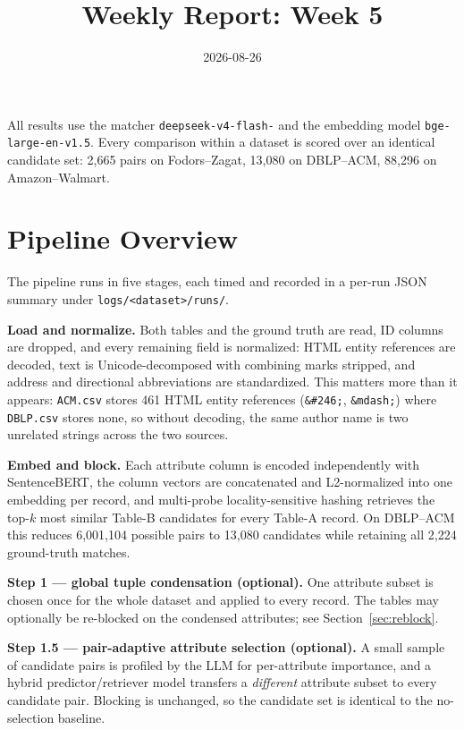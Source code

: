 \documentclass[11pt]{article}
\title{Weekly Report: Week 5}
\author{}
\date{2026-08-26}
\begin{document}
\maketitle

All results use the matcher
\texttt{deepseek-\allowbreak v4-\allowbreak flash-} and the embedding
model \texttt{bge-\allowbreak large-\allowbreak en-\allowbreak v1.5}. Every comparison within a dataset is scored over an identical
candidate set: 2{,}665 pairs on Fodors--Zagat, 13{,}080 on DBLP--ACM, 88{,}296 on
Amazon--Walmart.

\section{Pipeline Overview}

The pipeline runs in five stages, each timed and recorded in a per-run JSON summary under
\texttt{logs/<dataset>/runs/}.

\textbf{Load and normalize.} Both tables and the ground truth are read, ID columns are
dropped, and every remaining field is normalized: HTML entity references are decoded, text
is Unicode-decomposed with combining marks stripped, and address and directional
abbreviations are standardized. This matters more than it appears: \texttt{ACM.csv} stores
461 HTML entity references (\texttt{\&\#246;}, \texttt{\&mdash;}) where \texttt{DBLP.csv}
stores none, so without decoding, the same author name is two unrelated strings across the
two sources.

\textbf{Embed and block.} Each attribute column is encoded independently with SentenceBERT,
the column vectors are concatenated and L2-normalized into one embedding per record, and
multi-probe locality-sensitive hashing retrieves the top-$k$ most similar Table-B candidates
for every Table-A record. On DBLP--ACM this reduces 6{,}001{,}104 possible pairs to 13{,}080
candidates while retaining all 2{,}224 ground-truth matches.

\textbf{Step 1 --- global tuple condensation (optional).} One attribute subset is chosen
once for the whole dataset and applied to every record. The tables may optionally be
re-blocked on the condensed attributes; see Section~\ref{sec:reblock}.

\textbf{Step 1.5 --- pair-adaptive attribute selection (optional).} A small sample of
candidate pairs is profiled by the LLM for per-attribute importance, and a hybrid
predictor/retriever model transfers a \emph{different} attribute subset to every candidate
pair. Blocking is unchanged, so the candidate set is identical to the no-selection baseline.
\end{document}
